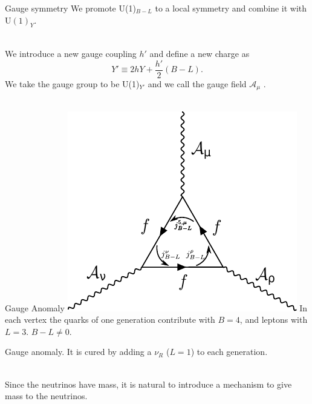\documentclass[14pt]{beamer}
\begin{document}
\begin{frame}{Gauge symmetry}
We promote U(1)$_{B-L}$ to a local symmetry and combine it with U$(1)_Y$. \\~\

We introduce a new gauge coupling $h'$ and define a new charge as
	$$Y' \equiv 2hY + \frac{h'}{2}(B-L).$$
We take the gauge group to be U(1)$_{Y'}$ and we call the gauge field $\mathcal{A}_{\mu}$ .\\~\
\end{frame}


\begin{frame}{Gauge Anomaly}
  \includegraphics[scale=1]{chapters/figures/triangularanomaly.pdf}%
In each vertex the quarks of one generation contribute with $B=4$, and leptons with $L=3$. $B-L\neq 0$.
\end{frame}

\begin{frame}

Gauge anomaly. It is cured by adding a $\nu_R$ ($L=1$) to each generation. \\~\

Since the neutrinos have mass, it is natural to introduce a mechanism to give mass to the neutrinos.
\end{frame}


%
\end{document}
